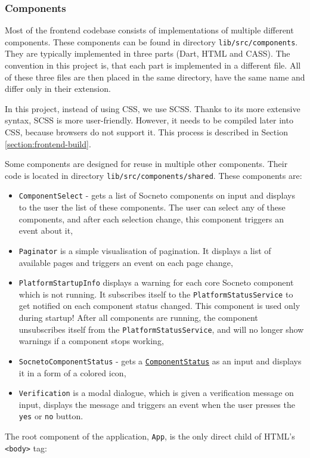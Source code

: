 \subsubsection{Components}
Most of the frontend codebase consists of implementations of multiple different components. These components can be found in directory \texttt{lib/src/components}. They are typically implemented in three parts (Dart, HTML and CASS). The convention in this project is, that each part is implemented in a different file. All of these three files are then placed in the same directory, have the same name and differ only in their extension. 

In this project, instead of using CSS, we use SCSS. Thanks to its more extensive syntax, SCSS is more user-friendly. However, it needs to be compiled later into CSS, because browsers do not support it. This process is described in Section \ref{section:frontend-build}.

Some components are designed for reuse in multiple other components. Their code is located in directory \texttt{lib/src/components/shared}. These components are:

\begin{itemize}
    \item \texttt{ComponentSelect} - gets a list of Socneto components on input and displays to the user the list of these components. The user can select any of these components, and after each selection change, this component triggers an event about it,
    
    \item \texttt{Paginator} is a simple visualisation of pagination. It displays a list of available pages and triggers an event on each page change,
    
    \item \texttt{PlatformStartupInfo} displays a warning for each core Socneto component which is not running. It subscribes itself to the \texttt{PlatformStatus\-Ser\-vice} to get notified on each component status changed. This component is used only during startup! After all  components are running, the component unsubscribes itself from the \texttt{PlatformStatusSer\-vice}, and will no longer show warnings if a component stops working,
    
    \item \texttt{SocnetoComponentStatus} - gets a \href{section:frontend-code-models-component-status}{\texttt{ComponentStatus}} as an input and displays it in a form of a colored icon,
    
    \item \texttt{Verification} is a modal dialogue, which is given a verification message on input, displays the message and triggers an event when the user presses the \texttt{yes} or \texttt{no} button.
\end{itemize}
The root component of the application, \texttt{App}, is the only direct child of HTML's \texttt{\textless body\textgreater} tag:

